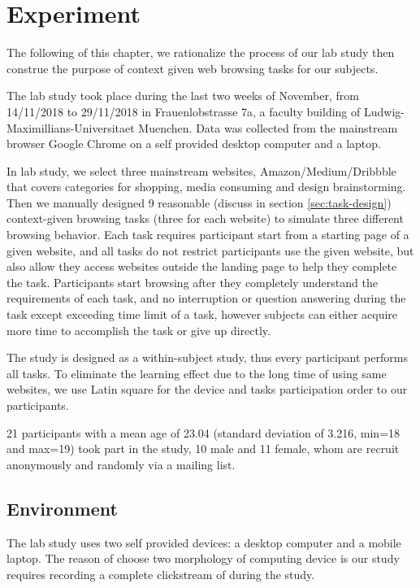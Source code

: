 \section{Experiment}
\label{ch:exp}

The following of this chapter, we rationalize the process of our lab study then construe the purpose of context given web browsing tasks for our subjects.

The lab study took place during the last two weeks of November, from 14/11/2018 to 29/11/2018
in Frauenlobstrasse 7a, a faculty building of Ludwig-Maximillians-Universitaet Muenchen.
Data was collected from the mainstream browser Google Chrome on a self provided 
desktop computer and a laptop.

In lab study, we select three mainstream websites, Amazon/Medium/Dribbble 
that covers categories for shopping, media consuming and design brainstorming. 
Then we manually designed 9 reasonable (discuss in section \ref{sec:task-design})
context-given browsing tasks (three for each website) to simulate three different browsing behavior.
Each task requires participant start from a starting page of a given website, and
all tasks do not restrict participants use the given website, but also allow they 
access websites outside the landing page to help they complete the task.
Participants start browsing after they completely understand the requirements of 
each task, and no interruption or question answering during the task
except exceeding time limit of a task, however subjects can either acquire more time 
to accomplish the task or give up directly.

The study is designed as a within-subject study, thus every participant performs all tasks. To eliminate the learning effect due to the long time of using same websites, 
we use Latin square \cite{cochran1950experimental} 
for the device and tasks participation order to our participants.

21 participants with a mean age of 23.04 (standard deviation of 3.216, min=18 and max=19) 
took part in the study, 10 male and 11 female, whom are recruit anonymously and randomly via a mailing list.

\subsection{Environment}

The lab study uses two self provided devices: a desktop computer and a mobile laptop.
The reason of choose two morphology of computing device is our study requires recording
a complete clickstream of during the study.


